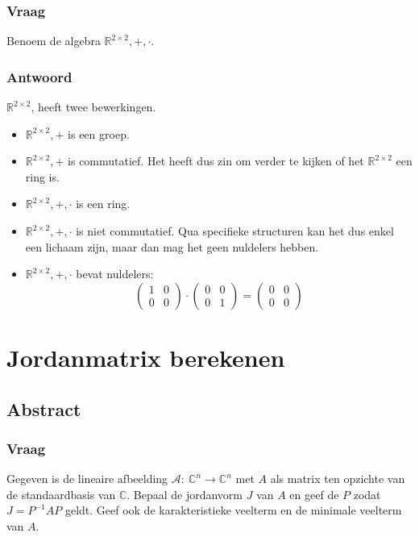\documentclass[main.tex]{subfiles}
\begin{document}
\subsubsection{Vraag}
\begin{center}
  Benoem de algebra $\mathbb{R}^{2\times 2},+,\cdot$.
\end{center}

\subsubsection{Antwoord}
$\mathbb{R}^{2\times 2}$, heeft twee bewerkingen.

\begin{itemize}
\item $\mathbb{R}^{2\times 2},+$ is een groep.
\item $\mathbb{R}^{2\times 2},+$ is commutatief.
  Het heeft dus zin om verder te kijken of het $\mathbb{R}^{2 \times 2}$ een ring is.
\item $\mathbb{R}^{2\times 2},+,\cdot$ is een ring.
\item $\mathbb{R}^{2\times 2},+,\cdot$ is niet commutatief.
  Qua specifieke structuren kan het dus enkel een lichaam zijn, maar dan mag het geen nuldelers hebben.
\item $\mathbb{R}^{2\times 2},+,\cdot$ bevat nuldelers:
  \[
  \begin{pmatrix}
    1 & 0\\
    0 & 0
  \end{pmatrix}
  \cdot
  \begin{pmatrix}
    0 & 0\\
    0 & 1
  \end{pmatrix}
  =
  \begin{pmatrix}
    0 & 0\\
    0 & 0
  \end{pmatrix}
  \]
\end{itemize}

\newpage
\section{Jordanmatrix berekenen}

\subsection*{Abstract}

\subsubsection*{Vraag}
Gegeven is de lineaire afbeelding $\mathcal{A}:\ \mathbb{C}^{n} \rightarrow \mathbb{C}^{n}$ met $A$ als matrix ten opzichte van de standaardbasis van $\mathbb{C}$.
Bepaal de jordanvorm $J$ van $A$ en geef de $P$ zodat $J=P^{-1}AP$ geldt.
Geef ook de karakteristieke veelterm en de minimale veelterm van $A$.
\end{document}
